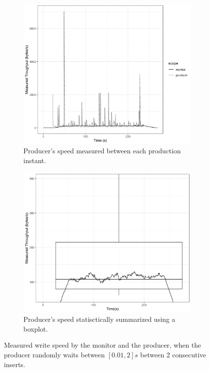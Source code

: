 \begin{figure}[!htb] 
    \centering
    \begin{subfigure}{0.45\textwidth}
        \includegraphics[width=\textwidth]{images/monitor/random_without_boxplot.png}
        \caption{
            Producer's speed measured between each production instant.
        }
        \label{fig:monitor_random} 
    \end{subfigure}
    \hfill
    \begin{subfigure}{0.45\textwidth}
        \includegraphics[width=\textwidth]{images/monitor/random_with_boxplot.png}
        \caption{
            Producer's speed statisctically summarized using a boxplot.
        }
        \label{fig:monitor_random_boxplot} 
    \end{subfigure}
    \caption{
        Measured write speed by the monitor and the producer, when the
        producer randomly waits between $[0.01, 2]s$ between 2 consecutive
        inserts.
    }
\end{figure}


